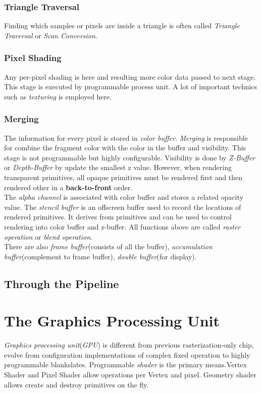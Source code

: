 \documentclass[10pt, a4paper]{article}
\begin{document}
            \subsubsection{Triangle Traversal} 
            Finding which samples or pixels are inside a triangle is often called \emph{Triangle Traversal} or \emph{Scan Conversion}.
            
            \subsubsection{Pixel Shading} 
            Any per-pixel shading is here and resulting more color data passed to next stage. This stage is executed by programmable process unit. A lot of important technics such as \emph{texturing} is employed here. 

            \subsubsection{Merging} 
            The information for every pixel is stored in \emph{color buffer}. \emph{Merging} is responsible for combine the fragment color with the color in the buffer and visibility. This stage is not programmable but highly configurable. Visibility is done by \emph{Z-Buffer} or \emph{Depth-Buffer} by update the smallest z value. However, when rendering transparent primitives, all opaque primitives must be rendered first and then rendered other in a \textbf{back-to-front} order. \\
            \indent The \emph{alpha channel} is associated with color buffer and stores a related opacity value. The \emph{stencil buffer} is an offscreen buffer used to record the locations of rendered primitives. It derives from primitives and can be used to control rendering into color buffer and z-buffer. All functions above are called \emph{raster operation} or \emph{blend operation}.\\
            \indent There are also \emph{frame buffer}(consists of all the buffer), \emph{accumulation buffer}(complement to frame buffer), \emph{double buffer}(for display).
    
        \subsection{Through the Pipeline}
        \newpage
    


    \section{The Graphics Processing Unit}
        \emph{Graphics processing unit}(\emph{GPU}) is different from previous rasterization-only chip, evolve from configuration implementations of complex fixed operation to highly programmable blankslates. Programmable \emph{shader} is the primary means.Vertex Shader and Pixel Shader allow operations per Vertex and pixel. Geometry shader allows create and destroy primitives on the fly. 
        
\end{document}

